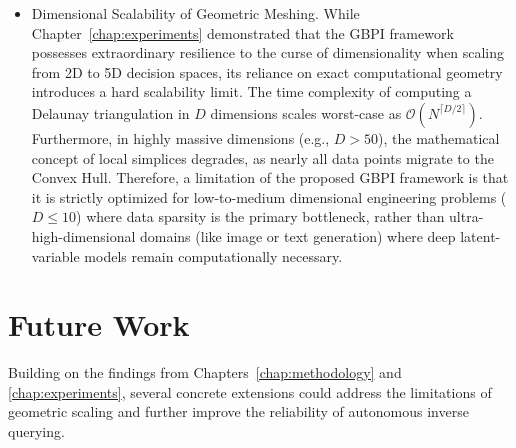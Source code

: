 \begin{itemize}
  \item Dimensional Scalability of Geometric Meshing.
  While Chapter~\ref{chap:experiments} demonstrated that the GBPI framework possesses extraordinary resilience to the curse of dimensionality when scaling from 2D to 5D decision spaces, its reliance on exact computational geometry introduces a hard scalability limit. The time complexity of computing a Delaunay triangulation in $D$ dimensions scales worst-case as $\mathcal{O}(N^{\lceil D/2 \rceil})$. Furthermore, in highly massive dimensions (e.g., $D > 50$), the mathematical concept of local simplices degrades, as nearly all data points migrate to the Convex Hull. Therefore, a limitation of the proposed GBPI framework is that it is strictly optimized for low-to-medium dimensional engineering problems ($D \le 10$) where data sparsity is the primary bottleneck, rather than ultra-high-dimensional domains (like image or text generation) where deep latent-variable models remain computationally necessary.

\end{itemize}

\section{Future Work}\label{sec:future_work}

Building on the findings from Chapters~\ref{chap:methodology} and \ref{chap:experiments}, several concrete extensions could address the limitations of geometric scaling and further improve the reliability of autonomous inverse querying.

